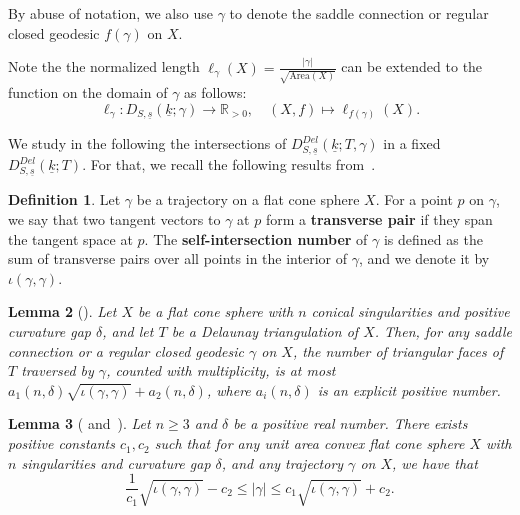 \documentclass{compositio}
\numberwithin{equation}{section}
\numberwithin{figure}{section}
\theoremstyle{definition}
\newtheorem{definition}{Definition}[section]
\theoremstyle{plain}
\newtheorem{lemma}[definition]{Lemma}
\begin{document}
{By abuse of notation, we also use $\gamma$ to denote the saddle connection or regular closed geodesic $f(\gamma)$ on $X$. 

Note the the normalized length $\ell_{\gamma}(X)=\frac{|\gamma|}{\sqrt{\mathrm{Area}(X)}}$ can be extended to the function on the domain of $\gamma$ as follows:
\begin{equation}\label{equ:normalizedlengthondomainofgeodesics}
    \ell_{\gamma}: D_{S,\underline{s}}(\underline{k};\gamma)\to \mathbb{R}_{>0},\quad (X,f)\mapsto \ell_{f(\gamma)}(X).
\end{equation}

We study in the following the intersections of $D_{S,\underline{s}}^{Del}(\underline{k};T, \gamma)$ in a fixed $D_{S,\underline{s}}^{Del}(\underline{k};T)$. For that, we recall the following results from~\cite{fu2023boundssaddleconnectionsflat, fu2024uniformlengthestimatestrajectories}.

\begin{definition}
    Let $\gamma$ be a trajectory on a flat cone sphere $X$. For a point $p$ on $\gamma$, we say that two tangent vectors to $\gamma$ at $p$ form a \textbf{transverse pair} if they span the tangent space at $p$. The \textbf{self-intersection number} of $\gamma$ is defined as the sum of transverse pairs over all points in the interior of $\gamma$, and we denote it by $\iota(\gamma, \gamma)$.
\end{definition}

\begin{lemma}[{\cite[Proposition 5.8]{fu2023boundssaddleconnectionsflat}}]\label{lem:boundcombinatoriallength}
    Let $X$ be a flat cone sphere with $n$ conical singularities and positive curvature gap $\delta$, and let $T$ be a Delaunay triangulation of $X$. Then, for any saddle connection or a regular closed geodesic $\gamma$ on $X$, the number of triangular faces of $T$ traversed by $\gamma$, counted with multiplicity, is at most $a_1(n,\delta)\sqrt{\iota(\gamma, \gamma)}+a_2(n,\delta)$, where $a_i(n,\delta)$ is an explicit positive number.
\end{lemma}

\begin{lemma}[{\cite[Theorem~1.5]{fu2023boundssaddleconnectionsflat} and~\cite[Theorem~1.6]{fu2024uniformlengthestimatestrajectories}}]\label{lem:lengthestimate}
    Let $n\ge 3$ and $\delta$ be a positive real number. There exists positive constants $c_1,c_2$ such that for any unit area convex flat cone sphere $X$ with $n$ singularities and curvature gap $\delta$, and any trajectory $\gamma$ on $X$, we have that
    \begin{equation}\label{equ:compare}
           \frac{1}{c_1}\sqrt{\iota(\gamma,\gamma)} - c_2 \le |\gamma|\le c_1\sqrt{\iota(\gamma,\gamma)} + c_2.
    \end{equation}
\end{lemma}

}
\end{document}
